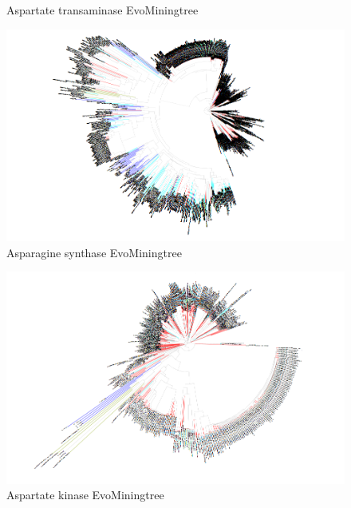 \documentclass[12pt,twoside]{reedthesis}
\begin{document}
\begin{figure}[h!tbp]
  \caption[Aspartate transaminase EvoMiningtree]{\normalsize{Aspartate transaminase EvoMiningtree}}
  \label{fig:Aspartate_transaminase_evo_tree}
  \end{figure}\begin{figure}[h!tbp]
  \centering
  \includegraphics[angle = 180,scale = 0.25]{chapter5/tree17.png}
  \caption[Asparagine synthase EvoMiningtree]{\normalsize{Asparagine synthase EvoMiningtree}}
  \label{fig:Asparagine_synthase_evo_tree}
  \end{figure}\begin{figure}[h!tbp]
  \centering
  \includegraphics[angle = 180,scale = 0.25]{chapter5/tree18.png}
  \caption[Aspartate kinase EvoMiningtree]{\normalsize{Aspartate kinase EvoMiningtree}}
  \label{fig:Aspartate_kinase_evo_tree}
  \end{figure}\begin{figure}[h!tbp]
  \centering

\end{figure}
\end{document}
